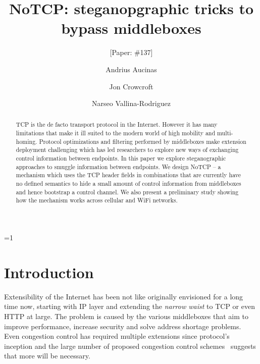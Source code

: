 \documentclass{sig-alternate-10pt}
\def\anon{1}        %
\begin{document}
\date{}


\title{NoTCP: steganopgraphic tricks to bypass middleboxes}
\ifnum\anon=1
\author{[Paper: \#137]}%
\else
{}
\author{
\alignauthor Andrius Aucinas\\
\and
\alignauthor Jon Crowcroft\\
\and
\alignauthor Narseo Vallina-Rodriguez\\
}
\fi

    
\maketitle
\begin{abstract}
TCP is the de facto transport protocol in the Internet. However it has many limitations that make it ill suited to the modern world of high mobility and multi-homing. Protocol optimizations and filtering performed by middleboxes make extension deployment challenging which has led researchers to explore new ways of exchanging control information between endpoints. In this paper we explore steganographic approaches to smuggle information between endpoints. We design NoTCP -- a mechanism which uses the TCP header fields in combinations that are currently have no defined semantics to hide a small amount of control information from middleboxes and hence bootstrap a control channel. We also present a preliminary study showing how the mechanism works across cellular and WiFi networks.
\end{abstract} 

\section{Introduction}
\label{section:intro}

Extensibility of the Internet has been not like originally envisioned for a long time now, starting with IP layer and extending the \emph{narrow waist} to TCP or even HTTP at large. The problem is caused by the various middleboxes that aim to improve performance\cite{Kopparty:2002ht,Chakravorty:2003dm}, increase security\cite{Handley:2001vp,Vutukuru:2008fc} and solve address shortage problems. Even congestion control has required multiple extensions since protocol's inception and the large number of proposed congestion control schemes~\cite{5462976} suggests that more will be necessary.
\end{document}
